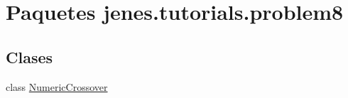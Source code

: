 \hypertarget{namespacejenes_1_1tutorials_1_1problem8}{\section{Paquetes jenes.\-tutorials.\-problem8}
\label{namespacejenes_1_1tutorials_1_1problem8}
}
\subsection*{Clases}
\begin{DoxyCompactItemize}
\item 
class \hyperlink{classjenes_1_1tutorials_1_1problem8_1_1_numeric_crossover}{Numeric\-Crossover}
\end{DoxyCompactItemize}
